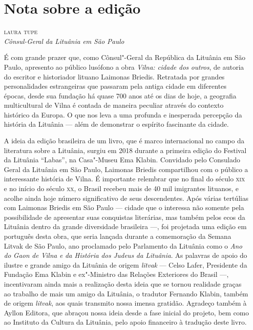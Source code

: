 \chapter[Nota sobre a edição, \textit{por Laura Tupe}]{Nota sobre a edição}

\begin{flushright}
\textsc{laura tupe}\\
\textit{Cônsul-Geral da Lituânia em São Paulo}
\end{flushright}

\noindent{}É com grande prazer que, como Cônsul"-Geral da República da Lituânia em
São Paulo, apresento ao público lusófono a obra \textit{Vilna: cidade dos
outros}, de autoria do escritor e historiador lituano Laimonas Briedis.
Retratada por grandes personalidades estrangeiras que passaram pela
antiga cidade em diferentes épocas, desde sua fundação há quase 700 anos
até os dias de hoje, a geografia multicultural de Vilna é contada
de maneira peculiar através do contexto histórico da Europa. O que nos
leva a uma profunda e inesperada percepção da história da Lituânia ---
além de demonstrar o espírito fascinante da cidade.

A ideia da edição brasileira de um livro, que é marco internacional no
campo da literatura sobre a Lituânia, surgiu em 2018 durante a primeira
edição do Festival da Lituânia ``Labas'', na Casa"-Museu Ema Klabin.
Convidado pelo Consulado Geral da Lituânia em São Paulo, Laimonas
Briedis compartilhou com o público a interessante história de Vilna. É
importante relembrar que no final do século \textsc{xix} e no início do século
\textsc{xx}, o Brasil recebeu mais de 40 mil imigrantes lituanos, e acolhe ainda
hoje número significativo de seus descendentes. Após várias tertúlias
com Laimonas Briedis em São Paulo --- cidade que o interessa não somente
pela possibilidade de apresentar suas conquistas literárias, mas também
pelos ecos da Lituânia dentro da grande diversidade brasileira ---, foi
projetada uma edição em português desta obra, que seria lançada durante
a comemoração da Semana Litvak de São Paulo, ano proclamado pelo
Parlamento da Lituânia como o \textit{Ano do Gaon de Vilna e da História
dos Judeus da Lituânia}. As palavras de apoio do ilustre e grande amigo
da Lituânia de origem \textit{litvak} --- Celso Lafer, Presidente da
Fundação Ema Klabin e ex"-Ministro das Relações Exteriores do Brasil ---,
incentivaram ainda mais a realização desta ideia que se tornou realidade
graças ao trabalho de mais um amigo da Lituânia, o tradutor Fernando
Klabin, também de origem \textit{litvak}, aos quais transmito nossa imensa
gratidão. Agradeço também à Ayllon Editora, que abraçou nossa ideia
desde a fase inicial do projeto, bem como ao Instituto da Cultura da
Lituânia, pelo apoio financeiro à tradução deste livro.

